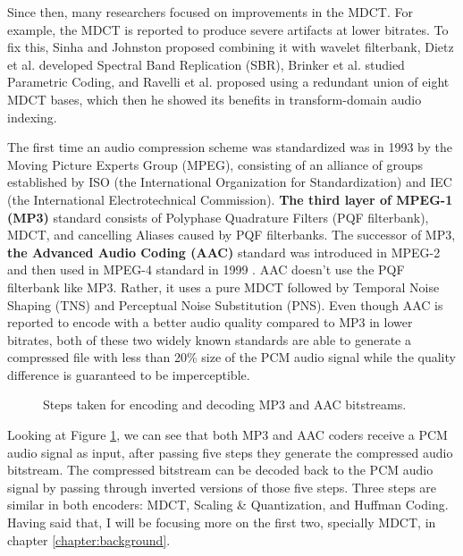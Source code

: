 Since then, many researchers focused on improvements in the MDCT. For example, the MDCT is reported to produce severe artifacts at lower bitrates. To fix this, Sinha and Johnston proposed combining it with wavelet filterbank\cite{sinha_audio_1996}, Dietz et al. developed Spectral Band Replication (SBR)\cite{dietz2002SBR}, Brinker et al. studied Parametric Coding\cite{brinker2002parametric}, and Ravelli et al. proposed using a redundant union of eight MDCT bases\cite{ravelli_union_2008}, which then he showed its benefits in transform-domain audio indexing\cite{ravelli_audio_2010}. 

The first time an audio compression scheme was standardized was in 1993 by the Moving Picture Experts Group (MPEG), consisting of an alliance of groups established by ISO (the International Organization for Standardization) and IEC (the International Electrotechnical Commission). \textbf{The third layer of MPEG-1 (MP3)} standard consists of Polyphase Quadrature Filters (PQF filterbank), MDCT, and cancelling Aliases caused by PQF filterbanks\cite{mpeg1-1993}. The successor of MP3, \textbf{the Advanced Audio Coding (AAC)} standard was introduced in MPEG-2 \cite{mpeg2-1995,bosi1997aac} and then used in MPEG-4 standard in 1999 \cite{mpeg4-2001}. AAC doesn't use the PQF filterbank like MP3. Rather, it uses a pure MDCT followed by Temporal Noise Shaping (TNS) and Perceptual Noise Substitution (PNS). Even though AAC is reported to encode with a better audio quality compared to MP3 in lower bitrates\cite{meares_report_1998}, both of these two widely known standards are able to generate a compressed file with less than 20\% size of the PCM audio signal while the quality difference is guaranteed to be imperceptible.

\begin{figure}[ht]
  
  \caption{Steps taken for encoding and decoding MP3 and AAC bitstreams.}
  \label{fig:mp3aac}
\end{figure}

Looking at Figure \ref{fig:mp3aac}, we can see that both MP3 and AAC coders receive a PCM audio signal as input, after passing five steps they generate the compressed audio bitstream. The compressed bitstream can be decoded back to the PCM audio signal by passing through inverted versions of those five steps. Three steps are similar in both encoders: MDCT, Scaling \& Quantization, and Huffman Coding. Having said that, I will be focusing more on the first two, specially MDCT, in chapter \ref{chapter:background}. 

